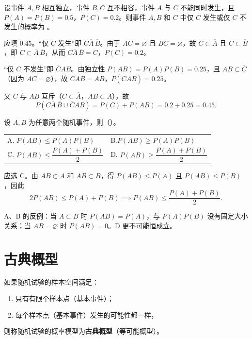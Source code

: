 ﻿\documentclass[lang=cn,11pt]{elegantbook}
\begin{document}
\begin{exercise}[提高]\label{exer:1-49}
设事件 \(A,B\) 相互独立，事件 \(B,C\) 互不相容，事件 \(A\) 与 \(C\) 不能同时发生，且 \(P(A)=P(B)=0.5\)，\(P(C)=0.2\)。则事件 \(A,B\) 和 \(C\) 中仅 \(C\) 发生或仅 \(C\) 不发生的概率为 \underline{\hspace{2cm}}。
\end{exercise}

\begin{solution}
应填 \(0.45\)。“仅 \(C\) 发生”即 \(C\overline{A}\,\overline{B}\)。由于 \(AC=\varnothing\) 且 \(BC=\varnothing\)，故 \(C\subset\overline{A}\) 且 \(C\subset\overline{B}\)，即 \(C\subset\overline{A}\,\overline{B}\)，从而 \(C\overline{A}\,\overline{B}=C\)，\(P(C)=0.2\)。

“仅 \(C\) 不发生”即 \(\overline{C}AB\)。由独立性 \(P(AB)=P(A)P(B)=0.25\)，且 \(AB\subset\overline{C}\)（因为 \(AC=\varnothing\)），故 \(\overline{C}AB=AB\)，\(P(\overline{C}AB)=0.25\)。

又 \(C\) 与 \(AB\) 互斥（\(C\subset\overline{A}\)，\(AB\subset A\)），故
\[
P(C\overline{A}\,\overline{B}\cup\overline{C}AB) = P(C)+P(AB) = 0.2+0.25 = 0.45.
\]
\end{solution}

\begin{exercise}[提高]\label{exer:1-50}
设 \(A,B\) 为任意两个随机事件，则（\quad）。\par
\begin{tabular}{ll}
A. \(P(AB)\le P(A)P(B)\) & B.\(P(AB)\ge P(A)P(B)\) \\[4pt]
C. \(P(AB)\le \dfrac{P(A)+P(B)}{2}\) & D. \(P(AB)\ge \dfrac{P(A)+P(B)}{2}\)
\end{tabular}
\end{exercise}

\begin{solution}
应选 C。由 \(AB\subset A\) 和 \(AB\subset B\)，得 \(P(AB)\le P(A)\) 且 \(P(AB)\le P(B)\)，因此
\[
2P(AB)\le P(A)+P(B) \implies P(AB)\le\frac{P(A)+P(B)}{2}.
\]

A、B 的反例：当 \(A\subset B\) 时 \(P(AB)=P(A)\)，与 \(P(A)P(B)\) 没有固定大小关系；当 \(AB=\varnothing\) 时 \(P(AB)=0\)。D 更不可能恒成立。
\end{solution}


\section{古典概型}

\begin{definition}[古典概型] \label{def:classical-prob}
如果随机试验的样本空间满足：
\begin{enumerate}
    \item 只有有限个样本点（基本事件）；
    \item 每个样本点（基本事件）发生的可能性都一样，
\end{enumerate}
则称随机试验的概率模型为\textbf{古典概型}（等可能概型）。
\end{definition}
\end{document}

